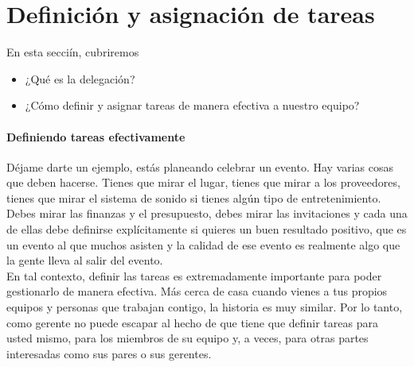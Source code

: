 \documentclass[10pt]{book}
\begin{document}
\section{Definición y asignación de tareas}
En esta secciín, cubriremos
\begin{itemize}
\item ¿Qué es la delegación?
\item ¿Cómo definir y asignar tareas de manera efectiva a nuestro equipo?
\end{itemize}
\paragraph{Definiendo tareas efectivamente}
Déjame darte un ejemplo, estás planeando celebrar un evento. Hay varias cosas que deben hacerse. Tienes que mirar el lugar, tienes que mirar a los proveedores, tienes que mirar el sistema de sonido si tienes algún tipo de entretenimiento. Debes mirar las finanzas y el presupuesto, debes mirar las invitaciones y cada una de ellas debe definirse explícitamente si quieres un buen resultado positivo, que es un evento al que muchos asisten y la calidad de ese evento es realmente algo que la gente lleva al salir del evento.\\
En tal contexto, definir las tareas es extremadamente importante para poder gestionarlo de manera efectiva. Más cerca de casa cuando vienes a tus propios equipos y personas que trabajan contigo, la historia es muy similar. Por lo tanto, como gerente no puede escapar al hecho de que tiene que definir tareas para usted mismo, para los miembros de su equipo y, a veces, para otras partes interesadas como sus pares o sus gerentes.\\
\end{document}
